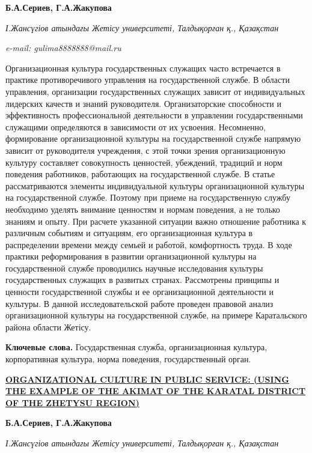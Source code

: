 {\bfseries Б.А.Сериев, Г.А.Жакупова\textsuperscript{\envelope }}

\emph{І.Жансүгіов атындағы Жетісу университеті, Талдықорған қ.,
Қазақстан}

\emph{e-mail: gulima8888888@mail.ru}

Организационная культура государственных служащих часто встречается в
практике противоречивого управления на государственной службе. В области
управления, организации государственных служащих зависит от
индивидуальных лидерских качеств и знаний руководителя. Организаторские
способности и эффективность профессиональной деятельности в управлении
государственными служащими определяются в зависимости от их усвоения.
Несомненно, формирование организационной культуры на государственной
службе напрямую зависит от руководителя учреждения, с этой точки зрения
организационную культуру составляет совокупность ценностей, убеждений,
традиций и норм поведения работников, работающих на государственной
службе. В статье рассматриваются элементы индивидуальной культуры
организационной культуры на государственной службе. Поэтому при приеме
на государственную службу необходимо уделять внимание ценностям и нормам
поведения, а не только знаниям и опыту. При расчете указанной ситуации
важно отношение работника к различным событиям и ситуациям, его
организационная культура в распределении времени между семьей и работой,
комфортность труда. В ходе практики реформирования в развитии
организационной культуры на государственной службе проводились научные
исследования культуры государственных служащих в развитых странах.
Рассмотрены принципы и ценности государственной службы и ее
организационной деятельности и культуры. В данной исследовательской
работе проведен правовой анализ организационной культуры на
государственной службе, на примере Каратальского района области Жетісу.

{\bfseries Ключевые слова.} Государственная служба, организационная
культура, корпоративная культура, норма поведения, государственный
орган.

\href{https://zhetysu.edu.kz/\%D1\%81\%D0\%B5\%D1\%80\%D0\%B8\%D0\%B5\%D0\%B2-\%D0\%B1\%D0\%BE\%D0\%BB\%D0\%B0\%D1\%82-\%D0\%B0\%D0\%B1\%D0\%B4\%D1\%83\%D0\%BB\%D0\%B4\%D0\%B0\%D2\%B1\%D0\%BB\%D1\%8B/}{{\bfseries ORGANIZATIONAL
CULTURE IN PUBLIC SERVICE: (USING THE EXAMPLE OF THE AKIMAT OF THE
KARATAL DISTRICT OF THE ZHETYSU REGION)}}

{\bfseries Б.А.Сериев, Г.А.Жакупова\textsuperscript{\envelope }}

\emph{І.Жансүгіов атындағы Жетісу университеті, Талдықорған қ.,
Қазақстан}

